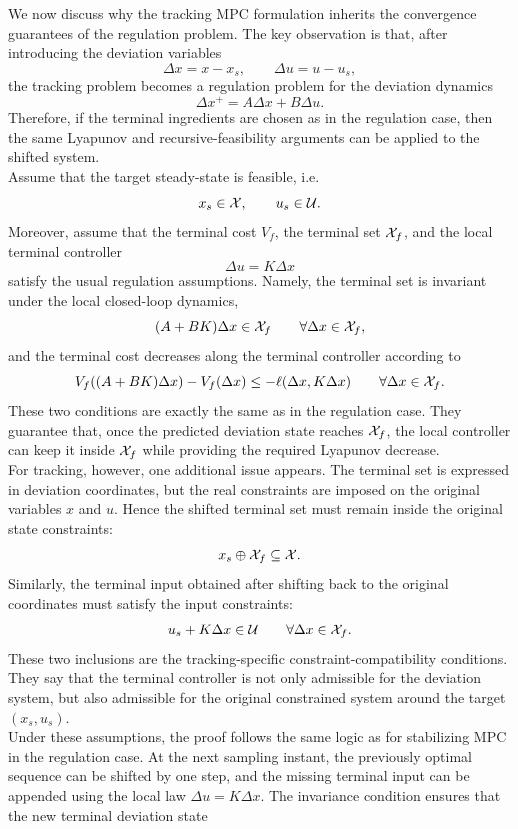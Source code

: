 We now discuss why the tracking MPC formulation inherits the convergence guarantees of the
regulation problem. The key observation is that, after introducing the deviation variables
\[
    \Delta x = x-x_s,\qquad \Delta u = u-u_s,
\]
the tracking problem becomes a regulation problem for the deviation dynamics
\[
    \Delta x^+ = A\Delta x+B\Delta u.
\]
Therefore, if the terminal ingredients are chosen as in the regulation case, then the same
Lyapunov and recursive-feasibility arguments can be applied to the shifted system.\\
Assume that the target steady-state is feasible, i.e.
\[
    x_s\in\mathcal{X},\qquad u_s\in\mathcal{U}.
\]
Moreover, assume that the terminal cost \(V_f\), the terminal set \(\mathcal{X}_f\), and the local
terminal controller
\[
    \Delta u = K\Delta x
\]
satisfy the usual regulation assumptions. Namely, the terminal set is invariant under the local
closed-loop dynamics,
\[
    (A+BK)\Delta x \in \mathcal{X}_f
    \qquad \forall \Delta x\in\mathcal{X}_f,
\]
and the terminal cost decreases along the terminal controller according to
\[
    V_f((A+BK)\Delta x)-V_f(\Delta x)
    \le
    -\ell(\Delta x,K\Delta x)
    \qquad \forall \Delta x\in\mathcal{X}_f .
\]
These two conditions are exactly the same as in the regulation case. They guarantee that, once
the predicted deviation state reaches \(\mathcal{X}_f\), the local controller can keep it inside
\(\mathcal{X}_f\) while providing the required Lyapunov decrease.\\
For tracking, however, one additional issue appears. The terminal set is expressed in deviation
coordinates, but the real constraints are imposed on the original variables \(x\) and \(u\). Hence
the shifted terminal set must remain inside the original state constraints:
\[
    x_s \oplus \mathcal{X}_f \subseteq \mathcal{X}.
\]
Similarly, the terminal input obtained after shifting back to the original coordinates must satisfy
the input constraints:
\[
    u_s + K\Delta x \in \mathcal{U}
    \qquad \forall \Delta x\in\mathcal{X}_f .
\]
These two inclusions are the tracking-specific constraint-compatibility conditions. They say
that the terminal controller is not only admissible for the deviation system, but also admissible
for the original constrained system around the target \((x_s,u_s)\).\\
Under these assumptions, the proof follows the same logic as for stabilizing MPC in the
regulation case. At the next sampling instant, the previously optimal sequence can be shifted by
one step, and the missing terminal input can be appended using the local law
\(\Delta u=K\Delta x\). The invariance condition ensures that the new terminal deviation state
